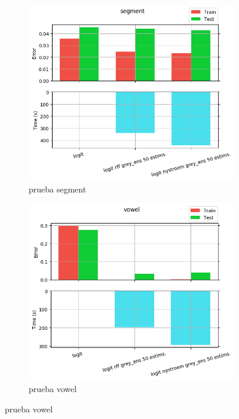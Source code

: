 \begin{figure}[ht]
  \centering
  \begin{subfigure}[b]{0.5\linewidth}
    \centering\includegraphics[width=\imgscale\linewidth]{Figures/2_4/segment}
    \caption{prueba segment}
    \label{fig:2_4_segment}
  \end{subfigure}%
  \begin{subfigure}[b]{0.5\linewidth}
    \centering\includegraphics[width=\imgscale\linewidth]{Figures/2_4/vowel}
    \caption{prueba vowel}
    \label{fig:2_4_vowel}
  \end{subfigure}
\end{figure}
